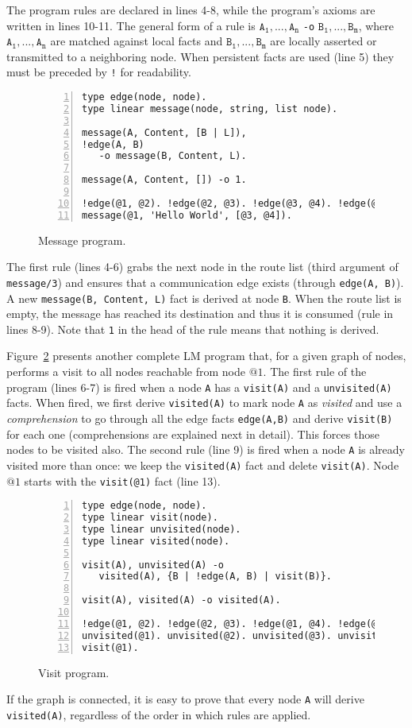 The program rules are declared in lines 4-8, while the program's axioms are written in lines 10-11.
The general form of a rule is $\mathtt{A_1},...,\mathtt{A_n}$ \texttt{-o} $\mathtt{B_1},...,\mathtt{B_m}$, where $\mathtt{A_1},...,\mathtt{A_n}$ are matched against local facts and $\mathtt{B_1},...,\mathtt{B_m}$ are locally asserted or transmitted to a neighboring node.
When persistent facts are used (line 5) they must be
preceded by \texttt{!} for readability.

\begin{figure}[h!]
\small\begin{Verbatim}[numbers=left]
type edge(node, node).
type linear message(node, string, list node).

message(A, Content, [B | L]),
!edge(A, B)
   -o message(B, Content, L).

message(A, Content, []) -o 1.

!edge(@1, @2). !edge(@2, @3). !edge(@3, @4). !edge(@1, @3).
message(@1, 'Hello World', [@3, @4]).
\end{Verbatim}
\caption{Message program.}
  \label{code:message}
\end{figure}

The first rule (lines 4-6) grabs the next node in the route list (third argument of \texttt{message/3}) and
ensures that a communication edge exists (through \texttt{edge(A, B)}).
A new \texttt{message(B,~Content,~L)} fact is derived at node \texttt{B}.
When the route list is empty, the message has reached its destination and thus it is consumed
(rule in lines 8-9). Note that \texttt{1} in the head of the rule means that nothing is derived.

Figure~\ref{code:visit} presents another complete LM program that, for a given graph
of nodes, performs a visit to all nodes reachable from node $@1$.
The first rule of the program (lines 6-7) is fired when a node \texttt{A} has a \texttt{visit(A)} and a \texttt{unvisited(A)} facts.
When fired, we first derive \texttt{visited(A)} to mark node \texttt{A} as \textit{visited} and use a
\emph{comprehension} to go through all the edge facts \texttt{edge(A,B)} and derive \texttt{visit(B)} for each
one (comprehensions are explained next in detail). This forces those nodes to be visited also.
The second rule (line 9) is fired when a
node \texttt{A} is already visited more than once: we keep the \texttt{visited(A)} fact and delete \texttt{visit(A)}.
Node $@1$ starts with the \texttt{visit(@1)} fact (line 13).

\begin{figure}[h!]
\small\begin{Verbatim}[numbers=left]
type edge(node, node).
type linear visit(node).
type linear unvisited(node).
type linear visited(node).

visit(A), unvisited(A) -o
   visited(A), {B | !edge(A, B) | visit(B)}.

visit(A), visited(A) -o visited(A).

!edge(@1, @2). !edge(@2, @3). !edge(@1, @4). !edge(@2, @4).
unvisited(@1). unvisited(@2). unvisited(@3). unvisited(@4).
visit(@1).
\end{Verbatim}
  \caption{Visit program.}
  \label{code:visit}
\end{figure}
\normalsize

If the graph is connected, it is easy to prove that every node \texttt{A} will derive \texttt{visited(A)},
regardless of the order in which rules are applied.
